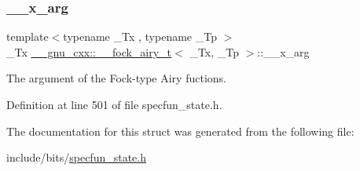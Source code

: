 \subsubsection{\texorpdfstring{\+\_\+\+\_\+x\+\_\+arg}{\_\_x\_arg}}
{\footnotesize\ttfamily template$<$typename \+\_\+\+Tx , typename \+\_\+\+Tp $>$ \\
\+\_\+\+Tx \hyperlink{struct____gnu__cxx_1_1____fock__airy__t}{\+\_\+\+\_\+gnu\+\_\+cxx\+::\+\_\+\+\_\+fock\+\_\+airy\+\_\+t}$<$ \+\_\+\+Tx, \+\_\+\+Tp $>$\+::\+\_\+\+\_\+x\+\_\+arg}



The argument of the Fock-\/type Airy fuctions. 



Definition at line 501 of file specfun\+\_\+state.\+h.



The documentation for this struct was generated from the following file\+:\begin{DoxyCompactItemize}
\item 
include/bits/\hyperlink{specfun__state_8h}{specfun\+\_\+state.\+h}\end{DoxyCompactItemize}
